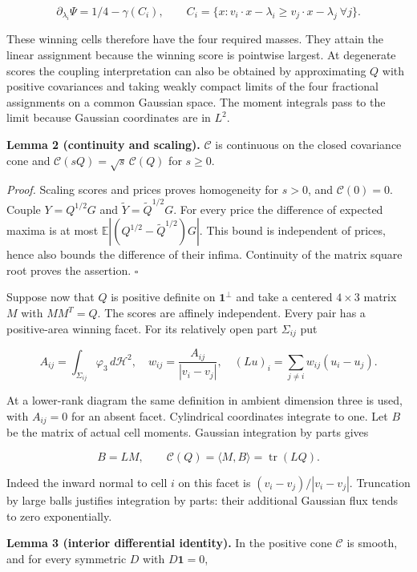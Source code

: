 \documentclass[
  11pt,
]{article}
\begin{document}
\[
 \partial_{\lambda_i}\Psi=1/4-\gamma(C_i),\qquad
 C_i=\{x:v_i\cdot x-\lambda_i\ge v_j\cdot x-\lambda_j\ \forall j\}.
                                                               \tag{3}
\]

These winning cells therefore have the four required masses. They attain
the linear assignment because the winning score is pointwise largest. At
degenerate scores the coupling interpretation can also be obtained by
approximating \(Q\) with positive covariances and taking weakly compact
limits of the four fractional assignments on a common Gaussian space.
The moment integrals pass to the limit because Gaussian coordinates are
in \(L^2\).

\textbf{Lemma 2 (continuity and scaling).} \(\mathcal C\) is continuous
on the closed covariance cone and
\(\mathcal C(sQ)=\sqrt{s}\,\mathcal C(Q)\) for \(s\ge0\).

\emph{Proof.} Scaling scores and prices proves homogeneity for \(s>0\),
and \(\mathcal C(0)=0\). Couple \(Y=Q^{1/2}G\) and
\(\widetilde Y=\widetilde Q^{1/2}G\). For every price the difference of
expected maxima is at most \(\mathbb E|(Q^{1/2}-\widetilde Q^{1/2})G|\).
This bound is independent of prices, hence also bounds the difference of
their infima. Continuity of the matrix square root proves the assertion.
\(\square\)

Suppose now that \(Q\) is positive definite on \(\mathbf1^\perp\) and
take a centered \(4\times3\) matrix \(M\) with \(MM^T=Q\). The scores
are affinely independent. Every pair has a positive-area winning facet.
For its relatively open part \(\Sigma_{ij}\) put

\[
 A_{ij}=\int_{\Sigma_{ij}}\varphi_3\,d\mathcal H^2,
 \quad w_{ij}=\frac{A_{ij}}{|v_i-v_j|},\quad
 (Lu)_i=\sum_{j\ne i}w_{ij}(u_i-u_j).                   \tag{4}
\]

At a lower-rank diagram the same definition in ambient dimension three
is used, with \(A_{ij}=0\) for an absent facet. Cylindrical coordinates
integrate to one. Let \(B\) be the matrix of actual cell moments.
Gaussian integration by parts gives

\[
 B=LM,\qquad \mathcal C(Q)=\langle M,B\rangle
                  =\operatorname{tr}(LQ).              \tag{5}
\]

Indeed the inward normal to cell \(i\) on this facet is
\((v_i-v_j)/|v_i-v_j|\). Truncation by large balls justifies integration
by parts: their additional Gaussian flux tends to zero exponentially.

\textbf{Lemma 3 (interior differential identity).} In the positive cone
\(\mathcal C\) is smooth, and for every symmetric \(D\) with
\(D\mathbf1=0\),
\end{document}
